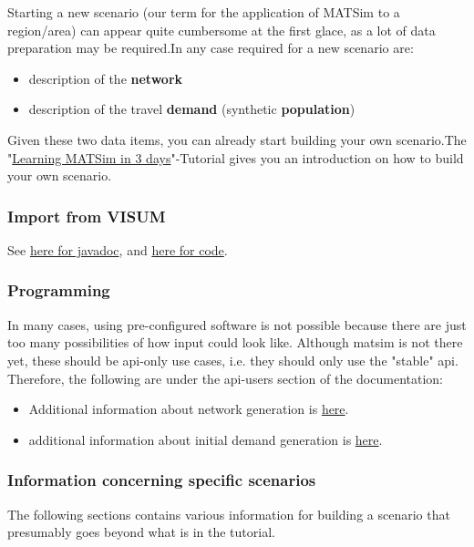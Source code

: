 \documentclass[a4paper,11pt]{report}
\begin{document}
Starting  a new scenario (our term for the application of MATSim to a  region/area) can appear quite cumbersome at the first glace, as a lot of  data preparation may be required.In any case required for a new  scenario are:
\begin{itemize}
	\item description of the \textbf{network}
	\item description of the travel \textbf{demand} (synthetic \textbf{population})
\end{itemize}

Given these two data items, you can already start building your own scenario.The "\href{http://www.matsim.org/docs/tutorials/learningIn3days}{Learning MATSim in 3 days}"-Tutorial gives you an introduction on how to build your own scenario.

\subsubsection{Import from VISUM}

See \href{http://matsim.org/javadoc/org/matsim/visum/package-summary.html}{here for javadoc}, and \href{http://matsim.org/xref/org/matsim/visum/package-summary.html}{here for code}.

\subsubsection{Programming}

In many cases, using pre-configured software is not possible because  there are just too many possibilities of how input could look like.  Although matsim is not there yet, these should be api-only use cases,  i.e. they should only use the "stable" api. Therefore, the  following are under the api-users section of the documentation:
\begin{itemize}
	\item Additional information about network generation is \href{http://matsim.org/node/588}{here}.
	\item additional information about initial demand generation is \href{http://matsim.org/node/340}{here}.
\end{itemize}

\subsubsection{Information concerning specific scenarios}

The following sections contains various information for building a scenario that presumably goes beyond what is in the tutorial.
\end{document}
